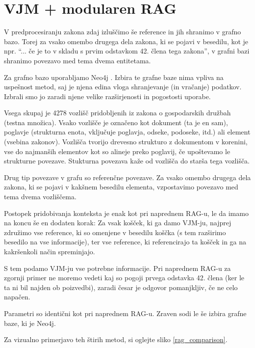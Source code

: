 \documentclass[a4paper,12pt,openright]{book}
\begin{document}
\section{VJM + modularen RAG}
\label{llm_kg_rag}

V predprocesiranju zakona zdaj izluščimo še reference in jih shranimo v grafno bazo. Torej za vsako omembo drugega dela zakona, ki se pojavi v besedilu, kot je npr. “... če je to v skladu s prvim odstavkom 42. člena tega zakona”, v grafni bazi shranimo povezavo med tema dvema entitetama.

Za grafno bazo uporabljamo Neo4j \cite{neo4j}. Izbira te grafne baze nima vpliva na uspešnost metod, saj je njena edina vloga shranjevanje (in vračanje) podatkov. Izbrali smo jo zaradi njene velike razširjenosti in pogostosti uporabe.

Vsega skupaj je 4278 vozlišč pridobljenih iz zakona o gospodarskih družbah (testna množica). Vsako vozlišče je označeno kot dokument (ta je en sam), poglavje (strukturna enota, vključuje poglavja, odseke, podoseke, itd.) ali element (vsebina zakonov). Vozlišča tvorijo drevesno strukturo z dokumentom v korenini, vse do najmanših elementov kot so alineje preko poglavij, če upoštevamo le strukturne povezave. Stukturna povezava kaže od vozlišča do starša tega vozlišča.

Drug tip povezave v grafu so referenčne povezave. Za vsako omembo drugega dela zakona, ki se pojavi v kakšnem besedilu elementa, vzpostavimo povezavo med tema dvema vozliščema.

Postopek pridobivanja konteksta je enak kot pri naprednem RAG-u, le da imamo na koncu še en dodaten korak: Za vsak košček, ki ga damo VJM-ju, najprej združimo vse reference, ki so omenjene v besedilu koščka (s tem razširimo besedilo na vse informacije), ter vse reference, ki referencirajo ta košček in ga na kakršenkoli način spreminjajo.

S tem podamo VJM-ju vse potrebne informacije. Pri naprednem RAG-u za zgornji primer ne moremo vedeti kaj so pogoji prvega odstavka 42. člena (ker le ta ni bil najden ob poizvedbi), zaradi česar je odgovor pomanjkljiv, če ne celo napačen.

Parametri so identični kot pri naprednem RAG-u. Zraven sodi le še izbira grafne baze, ki je Neo4j.

Za vizualno primerjavo teh štirih metod, si oglejte sliko \ref{rag_comparison}.
\end{document}
